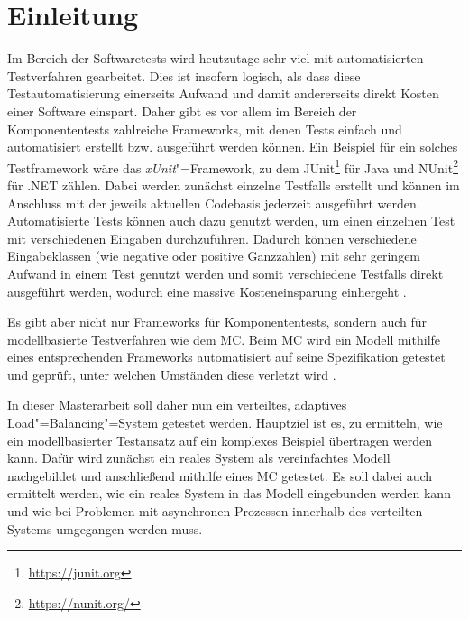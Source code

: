 \chapter{Einleitung}
\label{ch:intro}

Im Bereich der Softwaretests wird heutzutage sehr viel mit automatisierten Testverfahren gearbeitet.
Dies ist insofern logisch, als dass diese Testautomatisierung einerseits Aufwand und damit andererseits direkt Kosten einer Software einspart.
Daher gibt es vor allem im Bereich der Komponententests zahlreiche Frameworks, mit denen \glspl{Test} einfach und automatisiert erstellt bzw. ausgeführt werden können.
Ein Beispiel für ein solches Testframework wäre das \emph{xUnit}"=Framework, zu dem \uA JUnit\footnote{\url{https://junit.org}} für Java und NUnit\footnote{\url{https://nunit.org/}} für .NET zählen.
Dabei werden zunächst einzelne \glspl{Testfall} erstellt und können im Anschluss mit der jeweils aktuellen Codebasis jederzeit ausgeführt werden.
Automatisierte \glspl{Test} können auch dazu genutzt werden, um einen einzelnen \gls{Test} mit verschiedenen Eingaben durchzuführen.
Dadurch können verschiedene Eingabeklassen (wie negative oder positive Ganzzahlen) mit sehr geringem Aufwand in einem \gls{Test} genutzt werden und somit verschiedene \glspl{Testfall} direkt ausgeführt werden, wodurch eine massive Kosteneinsparung einhergeht \cite{Polo2013}.

Es gibt aber nicht nur Frameworks für Komponententests, sondern auch für modellbasierte Testverfahren wie \zB dem \gls{MC}.
Beim \gls{MC} wird ein Modell mithilfe eines entsprechenden Frameworks automatisiert auf seine Spezifikation getestet und geprüft, unter welchen Umständen diese verletzt wird \cite{Grumberg1999,Habermaier2015}.

In dieser Masterarbeit soll daher nun ein verteiltes, adaptives Load"=Balancing"=System getestet werden.
Hauptziel ist es, zu ermitteln, wie ein modellbasierter Testansatz auf ein komplexes Beispiel übertragen werden kann.
Dafür wird zunächst ein reales System als vereinfachtes Modell nachgebildet und anschließend mithilfe eines \gls{MC} getestet.
Es soll dabei auch ermittelt werden, wie ein reales System in das Modell eingebunden werden kann und wie bei Problemen mit asynchronen Prozessen innerhalb des verteilten Systems umgegangen werden muss.

